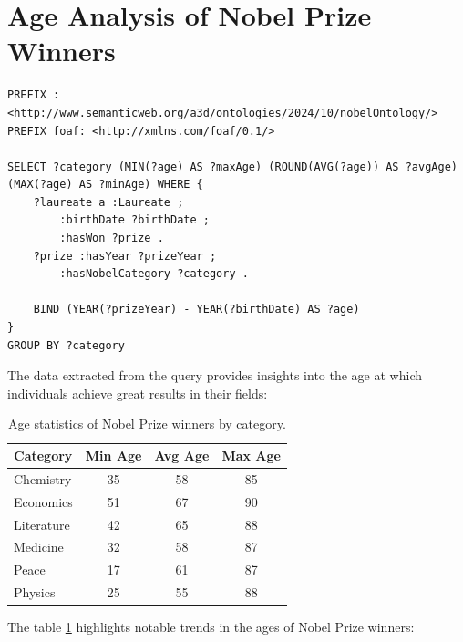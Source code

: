 \documentclass{article}
\begin{document}
\section{Age Analysis of Nobel Prize Winners} \label{winners age}
\begin{lstlisting}
PREFIX : <http://www.semanticweb.org/a3d/ontologies/2024/10/nobelOntology/>
PREFIX foaf: <http://xmlns.com/foaf/0.1/>

SELECT ?category (MIN(?age) AS ?maxAge) (ROUND(AVG(?age)) AS ?avgAge) (MAX(?age) AS ?minAge) WHERE {
    ?laureate a :Laureate ;
        :birthDate ?birthDate ;
        :hasWon ?prize .
    ?prize :hasYear ?prizeYear ;
        :hasNobelCategory ?category .

    BIND (YEAR(?prizeYear) - YEAR(?birthDate) AS ?age)
}
GROUP BY ?category
\end{lstlisting}

The data extracted from the query provides insights into the age at which individuals achieve great results in
their fields:

\begin{table}[H]
	\centering
	\caption{Age statistics of Nobel Prize winners by category.}
	\begin{tabular}{|l|c|c|c|}
		\hline
		\textbf{Category} & \textbf{Min Age} & \textbf{Avg Age} & \textbf{Max Age} \\ \hline
		Chemistry         & 35               & 58               & 85               \\ \hline
		Economics         & 51               & 67               & 90               \\ \hline
		Literature        & 42               & 65               & 88               \\ \hline
		Medicine          & 32               & 58               & 87               \\ \hline
		Peace             & 17               & 61               & 87               \\ \hline
		Physics           & 25               & 55               & 88               \\ \hline
	\end{tabular}
	\label{tab:age_analysis}
\end{table}

The table \ref{tab:age_analysis} highlights notable trends in the ages of Nobel Prize winners:
\end{document}
